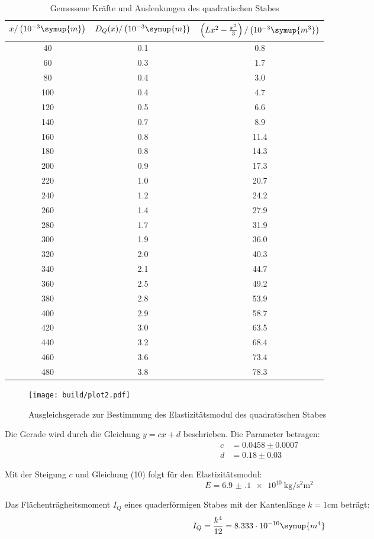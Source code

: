 \begin{table}[H]
  \centering
  \caption{Gemessene Kräfte und Auslenkungen des quadratischen Stabes}
  \label{tab:quadratischer Stab}
  \begin{tabular}{c c c}
    \toprule
    $x/\left(10^{-3}\symup{m}\right)$ & $D_Q(x)/\left(10^{-3}\symup{m}\right)$ & $\left(Lx^2 -\frac{x^3}{3}\right)/\left(10^{-3}\symup{m^3}\right)$\\
    \midrule
     40 & 0.1 &  0.8 \\
     60 & 0.3 &  1.7 \\
     80 & 0.4 &  3.0 \\
    100 & 0.4 &  4.7 \\
    120 & 0.5 &  6.6 \\
    140 & 0.7 &  8.9 \\
    160 & 0.8 & 11.4 \\
    180 & 0.8 & 14.3 \\
    200 & 0.9 & 17.3 \\
    220 & 1.0 & 20.7 \\
    240 & 1.2 & 24.2 \\
    260 & 1.4 & 27.9 \\
    280 & 1.7 & 31.9 \\
    300 & 1.9 & 36.0 \\
    320 & 2.0 & 40.3 \\
    340 & 2.1 & 44.7 \\
    360 & 2.5 & 49.2 \\
    380 & 2.8 & 53.9 \\
    400 & 2.9 & 58.7 \\
    420 & 3.0 & 63.5 \\
    440 & 3.2 & 68.4 \\
    460 & 3.6 & 73.4 \\
    480 & 3.8 & 78.3 \\
    \bottomrule
  \end{tabular}
\end{table}

\begin{figure}[H]
  \centering
  \texttt{[image: build/plot2.pdf]}
  \caption{Ausgleichsgerade zur Bestimmung des Elastizitätsmodul des quadratischen Stabes}
  \label{fig:Elastizitätsmodul des quadratischen Stabes}
\end{figure}

Die Gerade wird durch die Gleichung $y = cx + d$ beschrieben. Die Parameter betragen:
\begin{align*}
  c &= 0.0458 \pm 0.0007 \\
  d &= 0.18  \pm 0.03
\end{align*}


Mit der Steigung $c$ und Gleichung (10) folgt für den Elastizitätsmodul:
\begin{equation}
  E = \SI{6.9(1)e10}{\kilo\gram\per\second\squared\square\meter}
\end{equation}

Das Flächenträgheitsmoment $I_Q$ eines quaderförmigen Stabes mit der Kantenlänge
$k = 1$cm beträgt:
\begin{equation}
  I_Q = \frac{k^4}{12} = 8.333 \cdot 10^{-10} \symup{m^4}
\end{equation}
